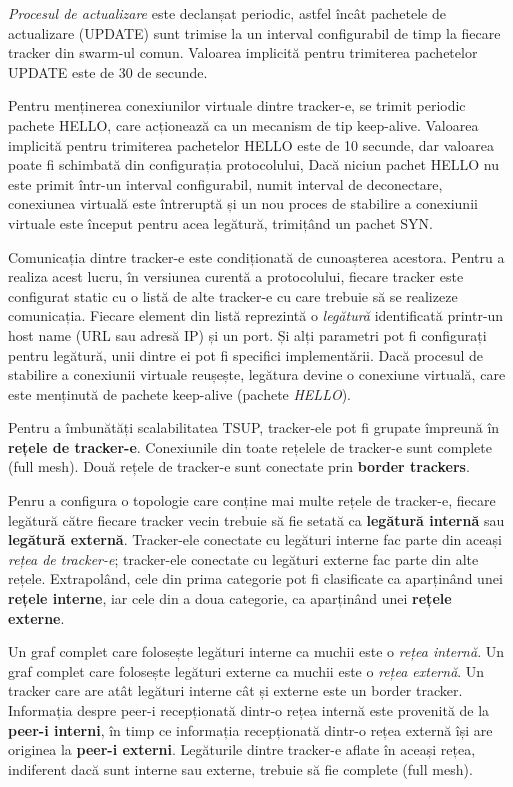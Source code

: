 \textit{Procesul de actualizare} este declanșat periodic, astfel încât pachetele de actualizare (UPDATE) sunt trimise la un interval configurabil de timp la fiecare tracker din swarm-ul comun. Valoarea implicită pentru trimiterea pachetelor UPDATE este de 30 de secunde.

Pentru menținerea conexiunilor virtuale dintre tracker-e, se trimit periodic pachete HELLO, care acționează ca un mecanism de tip keep-alive. Valoarea implicită pentru trimiterea pachetelor HELLO este de 10 secunde, dar valoarea poate fi schimbată din configurația protocolului, Dacă niciun pachet HELLO nu este primit într-un interval configurabil, numit interval de deconectare, conexiunea virtuală este întreruptă și un nou proces de stabilire a conexiunii virtuale este început pentru acea legătură, trimițând un pachet SYN.

Comunicația dintre tracker-e este condiționată de cunoașterea acestora. Pentru a realiza acest lucru, în versiunea curentă a protocolului, fiecare tracker este configurat static cu o listă de alte tracker-e cu care trebuie să se realizeze comunicația. Fiecare element din listă reprezintă o \textit{legătură} identificată printr-un host name (URL sau adresă IP) și un port. Și alți parametri pot fi configurați pentru legătură, unii dintre ei pot fi specifici implementării. Dacă procesul de stabilire a conexiunii virtuale reușește, legătura devine o conexiune virtuală, care este menținută de pachete keep-alive (pachete \textit{HELLO}).

Pentru a îmbunătăți scalabilitatea TSUP, tracker-ele pot fi grupate împreună în \textbf{rețele de tracker-e}. Conexiunile din toate rețelele de tracker-e sunt complete (full mesh). Două rețele de tracker-e sunt conectate prin \textbf{border trackers}.

Penru a configura o topologie care conține mai multe rețele de tracker-e, fiecare legătură către fiecare tracker vecin trebuie să fie setată ca \textbf{legătură internă} sau \textbf{legătură externă}. Tracker-ele conectate cu legături interne fac parte din aceași \textit{rețea de tracker-e}; tracker-ele conectate cu legături externe fac parte din alte rețele. Extrapolând, cele din prima categorie pot fi clasificate ca aparținând unei \textbf{rețele interne}, iar cele din a doua categorie, ca aparținând  unei \textbf{rețele externe}.

Un graf complet care folosește legături interne ca muchii este o \textit{rețea internă}. Un graf complet care folosește legături externe ca muchii este o \textit{rețea externă}. Un tracker care are atât legături interne cât și externe este un border tracker. Informația despre peer-i recepționată dintr-o rețea internă este provenită de la \textbf{peer-i interni}, în timp ce informația recepționată dintr-o rețea externă își are originea la \textbf{peer-i externi}.  Legăturile dintre tracker-e aflate în aceași rețea, indiferent dacă sunt interne sau externe, trebuie să fie complete (full mesh).

